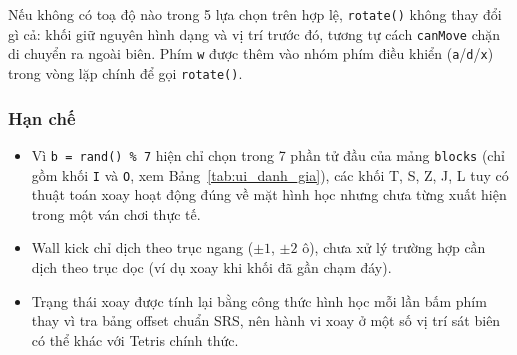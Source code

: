 Nếu không có toạ độ nào trong 5 lựa chọn trên hợp lệ, \texttt{rotate()} không thay đổi gì cả: khối giữ nguyên hình dạng và vị trí trước đó, tương tự cách \texttt{canMove} chặn di chuyển ra ngoài biên. Phím \texttt{w} được thêm vào nhóm phím điều khiển (\texttt{a}/\texttt{d}/\texttt{x}) trong vòng lặp chính để gọi \texttt{rotate()}.

\subsubsection{Hạn chế}

\begin{itemize}
    \item Vì \texttt{b = rand() \% 7} hiện chỉ chọn trong 7 phần tử đầu của mảng \texttt{blocks} (chỉ gồm khối \texttt{I} và \texttt{O}, xem Bảng~\ref{tab:ui_danh_gia}), các khối T, S, Z, J, L tuy có thuật toán xoay hoạt động đúng về mặt hình học nhưng chưa từng xuất hiện trong một ván chơi thực tế.
    \item Wall kick chỉ dịch theo trục ngang ($\pm 1$, $\pm 2$ ô), chưa xử lý trường hợp cần dịch theo trục dọc (ví dụ xoay khi khối đã gần chạm đáy).
    \item Trạng thái xoay được tính lại bằng công thức hình học mỗi lần bấm phím thay vì tra bảng offset chuẩn SRS, nên hành vi xoay ở một số vị trí sát biên có thể khác với Tetris chính thức.
\end{itemize}
